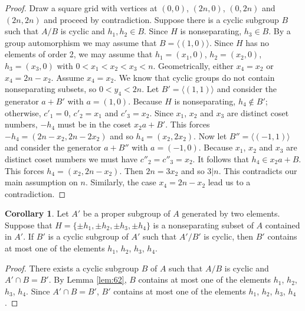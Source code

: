 \documentclass[article,dvisp]{amsart}
\theoremstyle{definition}
\newtheorem{cor}[thm]{Corollary}
\theoremstyle{remark}
\numberwithin{equation}{section}
\theoremstyle{lemma}
\begin{document}
\begin{proof}  Draw a square grid with vertices at $(0,0)$, $(2n,0)$, $(0,2n)$ and $(2n,2n)$ and proceed by contradiction. Suppose there is a cyclic subgroup $B$ such that $A/B$ is cyclic and $h_{1},h_{2}\in B$. Since $H$ is nonseparating, $h_{3}\in B$. By a group automorphism we may assume that $B=\langle (1,0)\rangle$. Since $H$ has no elements of order 2, we may assume that $h_{1}=(x_{1},0)$, $h_{2}=(x_{2},0)$, $h_{3}=(x_{3},0)$ with $0<x_{1}<x_{2}<x_{3}<n$. Geometrically, either $x_{4}=x_{2}$ or $x_{4}=2n-x_{2}$. Assume $x_{4}=x_{2}$. We know that cyclic groups do not contain nonseparating subsets, so $0<y_{4}<2n$. Let $B'=\langle(1,1)\rangle$ and consider the generator $a+B'$ with $a=(1,0)$. Because $H$ is nonseparating, $h_{4}\notin B'$; otherwise, $c'_{1}=0$, $c'_{2}=x_{1}$ and $c'_{3}=x_{2}$. Since $x_{1}$, $x_{2}$ and $x_{3}$ are distinct coset numbers, $-h_{4}$ must be in the coset $x_{2}a+B'$. This forces $-h_{4}=(2n-x_{2},2n-2x_{2})$ and so $h_{4}=(x_{2},2x_{2})$. Now let $B''=\langle(-1,1)\rangle$ and consider the generator $a+B''$ with $a=(-1,0)$. Because $x_{1}$, $x_{2}$ and $x_{3}$ are distinct coset numbers we must have $c''_{2}=c''_{3}=x_{2}$. It follows that $h_{4}\in x_{2}a+B$. This forces $h_{4}=(x_{2},2n-x_{2})$. Then $2n=3x_{2}$ and so $3|n$. This contradicts our main assumption on $n$. Similarly, the case $x_{4}=2n-x_{2}$ lead us to a contradiction.\end{proof}

\begin{cor} Let $A'$ be a proper subgroup of $A$ generated by two elements. Suppose that $H=\{\pm h_{1},\pm h_{2},\pm h_{3},\pm h_{4}\}$ is a nonseparating subset of $A$ contained in $A'$. If $B'$ is a cyclic subgroup of $A'$ such that $A'/B'$ is cyclic, then $B'$ contains at most one of the elements $h_{1}$, $h_{2}$, $h_{3}$, $h_{4}$.\end{cor}
\begin{proof}  There exists a cyclic subgroup $B$ of $A$ such that $A/B$ is cyclic and $A'\cap B=B'$. By Lemma \ref{lem:62}, $B$ contains at most one of the elements $h_{1}$, $h_{2}$, $h_{3}$, $h_{4}$. Since $A'\cap B=B'$, $B'$ contains at most one of the elements $h_{1}$, $h_{2}$, $h_{3}$, $h_{4}$.\end{proof}

\end{document}
